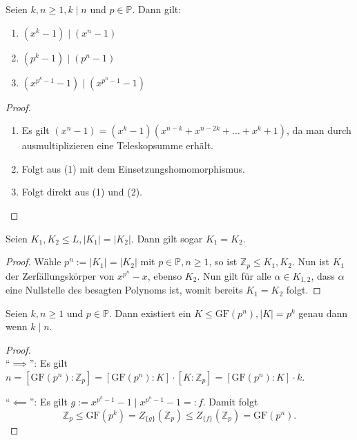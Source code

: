 \begin{lemma}
    Seien $k, n \geq 1, k \mid n$ und $p \in \mathbb{P}$. Dann gilt:
    \begin{enumerate}
        \item $(x^k - 1) \mid (x^n - 1)$
        \item $(p^k - 1) \mid (p^n - 1)$
        \item $(x^{p^k - 1} - 1) \mid (x^{p^n - 1} - 1)$
    \end{enumerate}
\end{lemma}

\begin{proof}{\ }
    \begin{enumerate}
        \item Es gilt $(x^n - 1) = (x^k - 1)(x^{n-k} + x^{n - 2k} + \hdots + x^k + 1)$, da man durch ausmultiplizieren eine Teleskopsumme erhält. 
        \item Folgt aus (1) mit dem Einsetzungshomomorphismus.
        \item Folgt direkt aus (1) und (2).
    \end{enumerate}
\end{proof}

\begin{lemma}
    Seien $K_1, K_2 \leq L, \vert K_1 \vert = \vert K_2 \vert$. Dann gilt sogar $K_1 = K_2$.
\end{lemma}

\begin{proof}
    Wähle $p^n := \vert K_1 \vert = \vert K_2 \vert$ mit $p \in \mathbb{P}, n \geq 1$, so ist $\mathbb{Z}_p \leq K_1, K_2$. Nun ist $K_1$ der Zerfällungskörper von $x^{p^n} - x$, ebenso $K_2$. Nun gilt für alle $\alpha \in K_{1,2}$, dass $\alpha$ eine Nullstelle des besagten Polynoms ist, womit bereits $K_1 = K_2$ folgt.
\end{proof}

\begin{proposition}
    Seien $k, n \geq 1$ und $p \in \mathbb{P}$. Dann existiert ein $K \leq \mathrm{GF}(p^n), \vert K \vert = p^k$ genau dann wenn $k \mid n$.
\end{proposition}

\begin{proof}{\ } \\
    ``$\implies$'': Es gilt $n = [\mathrm{GF}(p^n) : \mathbb{Z}_p] = [\mathrm{GF}(p^n) : K] \cdot [K : \mathbb{Z}_p] = [\mathrm{GF}(p^n) : K] \cdot k$.

    ``$\impliedby$'': Es gilt $g := x^{p^k - 1} - 1 \mid x^{p^n - 1} - 1 =: f$.
    Damit folgt
    $$ \mathbb{Z}_p \leq \mathrm{GF}(p^k) = Z_{\{g\}}(\mathbb{Z}_p) \leq Z_{\{f\}}(\mathbb{Z}_p) = \mathrm{GF}(p^n). $$
\end{proof}

